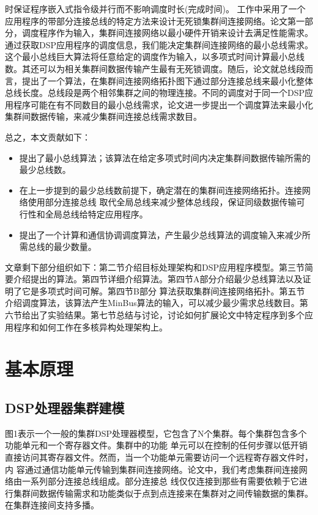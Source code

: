 时保证程序嵌入式指令级并行而不影响调度时长(完成时间)。
工作中采用了一个应用程序的带部分连接总线的特定方法来设计无死锁集群间连接网络。论文第一部分，调度程序作为输入，集群间连接网络以最小硬件开销来设计去满足性能需求。通过获取DSP应用程序的调度信息，我们能决定集群间连接网络的最小总线需求。这个最小总线巨大算法将任意给定的调度作为输入，以多项式时间计算最小总线数。其还可以为相关集群间数据传输产生最有无死锁调度。随后，论文就总线段而言，提出了一个算法，在集群间连接网络拓扑图下通过部分连接总线来最小化整体总线长度。总线段是两个相邻集群之间的物理连接。不同的调度对于同一个DSP应用程序可能在有不同数目的最小总线需求，论文进一步提出一个调度算法来最小化集群间数据传输，来减少集群间连接总线需求数目。

总之，本文贡献如下：
\begin{itemize}
  \item 提出了最小总线算法；该算法在给定多项式时间内决定集群间数据传输所需的最少总线数。
  \item 在上一步提到的最少总线数前提下，确定潜在的集群间连接网络拓扑。连接网络使用部分连接总线
取代全局总线来减少整体总线段，保证同级数据传输可行性和全局总线给特定应用程序。
  \item 提出了一个计算和通信协调调度算法，产生最少总线算法的调度输入来减少所需总线的最少数量。
\end{itemize}

文章剩下部分组织如下：第二节介绍目标处理架构和DSP应用程序模型。第三节简要介绍提出的算法。第四节详细介绍算法。第四节A部分介绍最少总线算法以及证明了它是多项式时间可解。第四节B部分 算法获取集群间连接网络拓扑。第五节介绍调度算法，该算法产生MinBus算法的输入，可以减少最少需求总线数目。第六节给出了实验结果。第七节总结与讨论，讨论如何扩展论文中特定程序到多个应用程序和如何工作在多核异构处理架构上。

\section{基本原理}
\subsection{DSP处理器集群建模}

图1表示一个一般的集群DSP处理器模型，它包含了N个集群。每个集群包含多个功能单元和一个寄存器文件。集群中的功能
单元可以在控制的任何步骤以低开销直接访问其寄存器文件。然而，当一个功能单元需要访问一个远程寄存器文件时，内
容通过通信功能单元传输到集群间连接网络。论文中，我们考虑集群间连接网络由一系列部分连接总线组成。部分连接总
线仅仅连接到那些有需要依赖于它进行集群间数据传输需求和功能类似于点到点连接来在集群对之间传输数据的集群。
在集群连接间支持多播。

